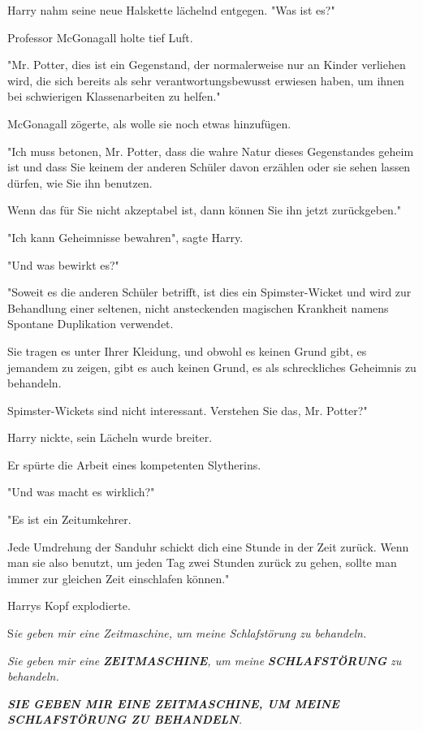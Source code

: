 {Harry nahm seine neue Halskette lächelnd entgegen. "Was ist es?"

Professor McGonagall holte tief Luft.

"Mr. Potter, dies ist ein Gegenstand, der normalerweise nur an Kinder verliehen wird, die sich bereits als sehr verantwortungsbewusst erwiesen haben, um ihnen bei schwierigen Klassenarbeiten zu helfen."

McGonagall zögerte, als wolle sie noch etwas hinzufügen.

"Ich muss betonen, Mr. Potter, dass die wahre Natur dieses Gegenstandes geheim ist und dass Sie keinem der anderen Schüler davon erzählen oder sie sehen lassen dürfen, wie Sie ihn benutzen.

Wenn das für Sie nicht akzeptabel ist, dann können Sie ihn jetzt zurückgeben."

"Ich kann Geheimnisse bewahren", sagte Harry.

"Und was bewirkt es?"

"Soweit es die anderen Schüler betrifft, ist dies ein Spimster-Wicket und wird zur Behandlung einer seltenen, nicht ansteckenden magischen Krankheit namens Spontane Duplikation verwendet.

Sie tragen es unter Ihrer Kleidung, und obwohl es keinen Grund gibt, es jemandem zu zeigen, gibt es auch keinen Grund, es als schreckliches Geheimnis zu behandeln.

Spimster-Wickets sind nicht interessant. Verstehen Sie das, Mr. Potter?"

Harry nickte, sein Lächeln wurde breiter.

Er spürte die Arbeit eines kompetenten Slytherins.

"Und was macht es wirklich?"

"Es ist ein Zeitumkehrer.

Jede Umdrehung der Sanduhr schickt dich eine Stunde in der Zeit zurück. Wenn man sie also benutzt, um jeden Tag zwei Stunden zurück zu gehen, sollte man immer zur gleichen Zeit einschlafen können."

Harrys Kopf explodierte.

S\emph{ie geben mir eine Zeitmaschine, um meine Schlafstörung zu behandeln.}

\emph{Sie geben mir eine} \textbf{\emph{ZEITMASCHINE}}\emph{, um meine} \textbf{\emph{SCHLAFSTÖRUNG}} \emph{zu behandeln.}

\emph{\hfill\break }\textbf{\emph{SIE GEBEN MIR EINE ZEITMASCHINE, UM MEINE SCHLAFSTÖRUNG ZU BEHANDELN}}\emph{.}

}
